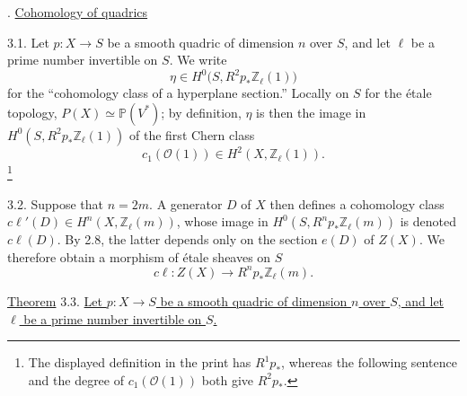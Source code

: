 . \underline{Cohomology of quadrics}

3.1. Let $p:X\longrightarrow S$ be a smooth quadric of dimension $n$
over $S$, and let $\ell$ be a prime number invertible on $S$.  We write
\begin{equation*}
\eta\in H^0\bigl(S,R^2p_*\mathbb Z_\ell(1)\bigr)
\end{equation*}
for the ``cohomology class of a hyperplane section.''  Locally on $S$
for the \'{e}tale topology, $P(X)\simeq\mathbb P(V^*)$; by definition,
$\eta$ is then the image in
$H^0(S,R^2p_*\mathbb Z_\ell(1))$ of the first Chern class
\begin{equation*}
c_1(\mathcal O(1))\in H^2(X,\mathbb Z_\ell(1)).
\end{equation*}
\footnote{The displayed definition in the print has $R^1p_*$, whereas
the following sentence and the degree of $c_1(\mathcal O(1))$ both give
$R^2p_*$.}

3.2. Suppose that $n=2m$.  A generator $D$ of $X$ then defines a
cohomology class
$c\ell'(D)\in H^n(X,\mathbb Z_\ell(m))$, whose image in
$H^0(S,R^np_*\mathbb Z_\ell(m))$ is denoted $c\ell(D)$.  By 2.8, the
latter depends only on the section $e(D)$ of $Z(X)$.  We therefore obtain
a morphism of \'{e}tale sheaves on $S$
\begin{equation}\tag{3.2.1}
c\ell:Z(X)\longrightarrow R^np_*\mathbb Z_\ell(m).
\end{equation}

\underline{Theorem} 3.3. \underline{Let $p:X\longrightarrow S$ be a
smooth quadric of dimension $n$ over $S$, and let $\ell$ be a prime
number invertible on $S$.}

